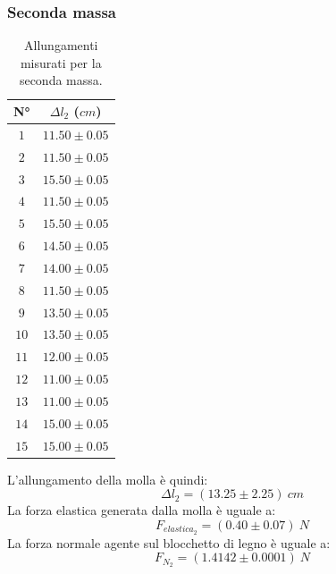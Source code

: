 \documentclass[11pt]{article}
\begin{document}
\subsubsection{Seconda massa}
\begin{table}[H]
\centering
\begin{tabular}{|c|c|}
\hline
\textbf{N°} & \textbf{$\Delta l_2$ ($cm$)}\\
\hline
$1$ & $11.50\pm 0.05$ \\
\hline
$2$ & $11.50\pm 0.05$ \\
\hline
$3$ & $15.50\pm 0.05$ \\
\hline
$4$ & $11.50\pm 0.05$ \\
\hline
$5$ & $15.50\pm 0.05$ \\
\hline
$6$ & $14.50\pm 0.05$ \\
\hline
$7$ & $14.00\pm 0.05$ \\
\hline
$8$ & $11.50\pm 0.05$ \\
\hline
$9$ & $13.50\pm 0.05$ \\
\hline
$10$ & $13.50\pm 0.05$ \\
\hline
$11$ & $12.00\pm 0.05$ \\
\hline
$12$ & $11.00\pm 0.05$ \\
\hline
$13$ & $11.00\pm 0.05$ \\
\hline
$14$ & $15.00\pm 0.05$ \\
\hline
$15$ & $15.00\pm 0.05$ \\
\hline
\end{tabular}
\caption{Allungamenti misurati per la seconda massa.}
\label{tab:}
\end{table}
L'allungamento della molla è quindi:
\begin{equation}
    \Delta l_2=(13.25\pm 2.25)\ cm
\end{equation}
La forza elastica generata dalla molla è uguale a:
\begin{equation}
    F_{elastica_2} = (0.40\pm 0.07)\ N
\end{equation}
La forza normale agente sul blocchetto di legno è uguale a:
\begin{equation}
    F_{N_2} = (1.4142\pm 0.0001)\ N
\end{equation}
\end{document}
